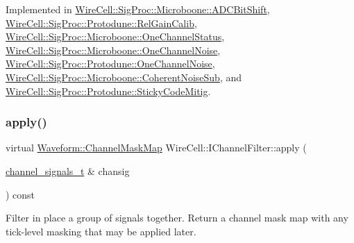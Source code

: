 Implemented in \hyperlink{class_wire_cell_1_1_sig_proc_1_1_microboone_1_1_a_d_c_bit_shift_a78c5feeb9f0ab8a04af03d75a8c83046}{Wire\+Cell\+::\+Sig\+Proc\+::\+Microboone\+::\+A\+D\+C\+Bit\+Shift}, \hyperlink{class_wire_cell_1_1_sig_proc_1_1_protodune_1_1_rel_gain_calib_ae841532dd723111810c797fb13e0df3a}{Wire\+Cell\+::\+Sig\+Proc\+::\+Protodune\+::\+Rel\+Gain\+Calib}, \hyperlink{class_wire_cell_1_1_sig_proc_1_1_microboone_1_1_one_channel_status_af75669068bb7e6b9e618c887025c9fa3}{Wire\+Cell\+::\+Sig\+Proc\+::\+Microboone\+::\+One\+Channel\+Status}, \hyperlink{class_wire_cell_1_1_sig_proc_1_1_microboone_1_1_one_channel_noise_a4d5cb537b5d9ca736fc1bbd3c463b76f}{Wire\+Cell\+::\+Sig\+Proc\+::\+Microboone\+::\+One\+Channel\+Noise}, \hyperlink{class_wire_cell_1_1_sig_proc_1_1_protodune_1_1_one_channel_noise_a7d891c87a8867d57fc4b6ac86d226876}{Wire\+Cell\+::\+Sig\+Proc\+::\+Protodune\+::\+One\+Channel\+Noise}, \hyperlink{class_wire_cell_1_1_sig_proc_1_1_microboone_1_1_coherent_noise_sub_a039888ecfad21c7a4e5724566661501d}{Wire\+Cell\+::\+Sig\+Proc\+::\+Microboone\+::\+Coherent\+Noise\+Sub}, and \hyperlink{class_wire_cell_1_1_sig_proc_1_1_protodune_1_1_sticky_code_mitig_a158d7c7d804ad6548383fedba2d3f115}{Wire\+Cell\+::\+Sig\+Proc\+::\+Protodune\+::\+Sticky\+Code\+Mitig}.

\mbox{\label{class_wire_cell_1_1_i_channel_filter_a47554d77b1dca5596dc61e2221e0a137}} 
\subsubsection{\texorpdfstring{apply()}{apply()}\hspace{0.1cm}{\footnotesize\ttfamily [2/2]}}
{\footnotesize\ttfamily virtual \hyperlink{namespace_wire_cell_1_1_waveform_a18b9ae61c858e340252ba3ac83ac3bc0}{Waveform\+::\+Channel\+Mask\+Map} Wire\+Cell\+::\+I\+Channel\+Filter\+::apply (\begin{DoxyParamCaption}\item[{\hyperlink{class_wire_cell_1_1_i_channel_filter_a44de35ce47701d84cd45393c6bcd5e2f}{channel\+\_\+signals\+\_\+t} \&}]{chansig }\end{DoxyParamCaption}) const\hspace{0.3cm}{\ttfamily [pure virtual]}}

Filter in place a group of signals together. Return a channel mask map with any tick-\/level masking that may be applied later. 

